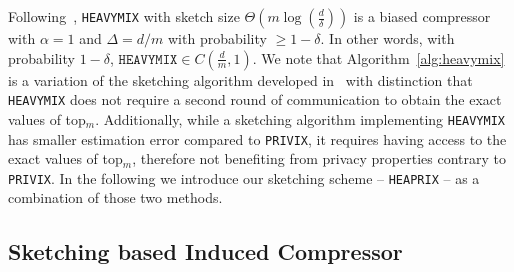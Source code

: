 \documentclass[11pt]{article}
\newtheorem{lemma}{Lemma}
\begin{document}
Following~\citet{ivkin2019communication}, \texttt{HEAVYMIX} with sketch size $\Theta\left(m\log\left(\frac{d}{\delta}\right)\right)$ is a biased compressor with $\alpha=1$ and  $\Delta=d/m$ with probability $\geq1-\delta$. In other words, with probability $1-\delta$, $\texttt{HEAVYMIX}\in C(\frac{d}{m},1)$. 
We note that Algorithm~\ref{alg:heavymix} is a variation of the sketching algorithm developed in~\citet{ivkin2019communication} with distinction that \texttt{HEAVYMIX} does not require a second round of communication to obtain the exact values of top$_m$. 
Additionally, while a sketching algorithm implementing \texttt{HEAVYMIX} has smaller estimation error compared to \texttt{PRIVIX}, it requires having access to the exact values of top$_m$, therefore not benefiting from privacy properties contrary to \texttt{PRIVIX}. 
In the following we introduce our sketching scheme -- \texttt{HEAPRIX} -- as a combination of those two methods. 

\vspace{-0.05in}
\subsection{Sketching based Induced Compressor}
\vspace{-0.05in}
\end{document}
